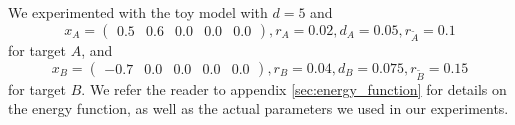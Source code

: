 


We experimented with the toy model with $d = 5$ and
\begin{equation*}
x_A = \begin{pmatrix}%
0.5&0.6&0.0&0.0&0.0%
\end{pmatrix},
r_A = 0.02,
d_A = 0.05,
r_{\tilde{A}} = 0.1
\end{equation*}
for target $A$, and
\begin{equation*}
x_B = \begin{pmatrix}%
-0.7&0.0&0.0&0.0&0.0%
\end{pmatrix},
r_B = 0.04,
d_B = 0.075,
r_{\tilde{B}} = 0.15
\end{equation*}
for target $B$.  We refer the reader to appendix \ref{sec:energy_function} for details on the energy function, as well as the actual parameters we used in our experiments.
